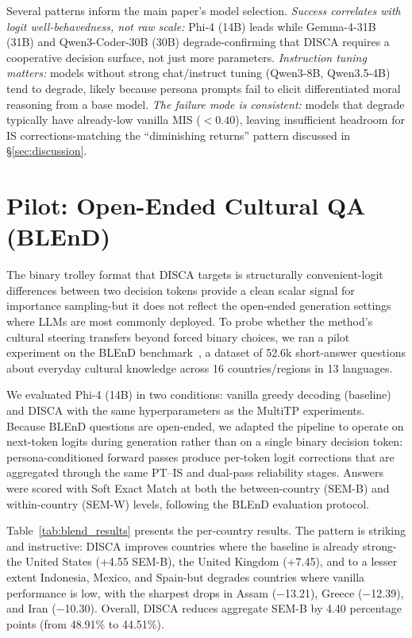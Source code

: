 \documentclass{article}
\begin{document}
Several patterns inform the main paper's model selection.
\emph{Success correlates with logit well-behavedness, not raw scale:} Phi-4 (14B)
leads while Gemma-4-31B (31B) and Qwen3-Coder-30B (30B) degrade-confirming that
DISCA requires a cooperative decision surface, not just more parameters.
\emph{Instruction tuning matters:} models without strong chat/instruct tuning
(Qwen3-8B, Qwen3.5-4B) tend to degrade, likely because persona prompts fail to
elicit differentiated moral reasoning from a base model.
\emph{The failure mode is consistent:} models that degrade typically have
already-low vanilla MIS ($<0.40$), leaving insufficient headroom for IS
corrections-matching the ``diminishing returns'' pattern discussed in
\S\ref{sec:discussion}.

\section{Pilot: Open-Ended Cultural QA (BLEnD)}
\label{app:blend}

The binary trolley format that DISCA targets is structurally convenient-logit differences between two decision tokens provide a clean scalar signal for importance sampling-but it does not reflect the open-ended generation settings where LLMs are most commonly deployed. To probe whether the method's cultural steering transfers beyond forced binary choices, we ran a pilot experiment on the BLEnD benchmark~\citep{myung2024blend}, a dataset of 52.6k short-answer questions about everyday cultural knowledge across 16 countries/regions in 13 languages.

We evaluated Phi-4 (14B) in two conditions: vanilla greedy decoding (baseline) and DISCA with the same hyperparameters as the MultiTP experiments. Because BLEnD questions are open-ended, we adapted the pipeline to operate on next-token logits during generation rather than on a single binary decision token: persona-conditioned forward passes produce per-token logit corrections that are aggregated through the same PT--IS and dual-pass reliability stages. Answers were scored with Soft Exact Match at both the between-country (SEM-B) and within-country (SEM-W) levels, following the BLEnD evaluation protocol.

Table~\ref{tab:blend_results} presents the per-country results. The pattern is striking and instructive: DISCA improves countries where the baseline is already strong-the United States (+4.55 SEM-B), the United Kingdom (+7.45), and to a lesser extent Indonesia, Mexico, and Spain-but degrades countries where vanilla performance is low, with the sharpest drops in Assam ($-$13.21), Greece ($-$12.39), and Iran ($-$10.30). Overall, DISCA reduces aggregate SEM-B by 4.40 percentage points (from 48.91\% to 44.51\%).
\end{document}
